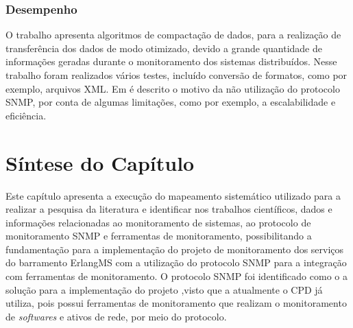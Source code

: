 \subsubsection{Desempenho}

O trabalho \cite{wang2016improvements} apresenta algoritmos de compactação de dados, para a realização de transferência dos dados de modo otimizado, devido a grande quantidade de informações geradas durante o monitoramento dos sistemas distribuídos. Nesse trabalho foram realizados vários testes, incluído conversão de formatos, como por exemplo, arquivos XML. Em \cite{kotsopoulos2008soa} é descrito o motivo da não utilização do protocolo SNMP, por conta de algumas limitações, como por exemplo, a escalabilidade e eficiência. 


\section{Síntese do Capítulo}

Este capítulo apresenta a execução do mapeamento sistemático utilizado para a realizar a pesquisa da literatura e identificar nos trabalhos científicos, dados e informações relacionadas ao monitoramento de sistemas, ao protocolo de monitoramento \acrshort{SNMP} e ferramentas de monitoramento, possibilitando a fundamentação para a implementação do projeto de monitoramento dos serviços do barramento ErlangMS com a utilização do protocolo \acrshort{SNMP} para a integração com ferramentas de monitoramento. O protocolo \acrshort{SNMP} foi identificado como o a solução para a implementação do projeto ,visto que a atualmente o \acrshort{CPD} já utiliza, pois  possui ferramentas de monitoramento que realizam o monitoramento de \textit{softwares} e ativos de rede, por meio do protocolo. 



